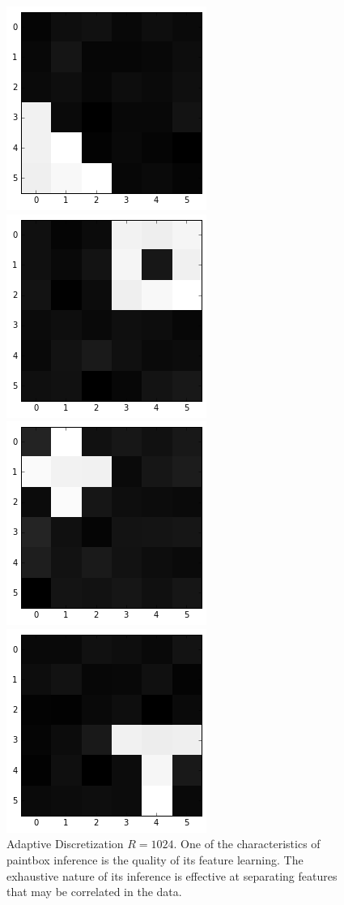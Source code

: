 \documentclass{article}
\begin{document}
\begin{figure}[ht]
\vskip 0.2in
\begin{center}
\centerline{\includegraphics[scale=0.35]{f1}}
\centerline{\includegraphics[scale=0.35]{f2}}
\centerline{\includegraphics[scale=0.35]{f3}}
\centerline{\includegraphics[scale=0.35]{f4}}
\caption{Adaptive Discretization $R = 1024$.  One of the characteristics of paintbox inference is the quality of its feature learning.  The exhaustive nature of its inference is effective at separating features that may be correlated in the data.}
\label{feature1024}
\end{center}
\vskip -0.2in
\end{figure}
\end{document}
